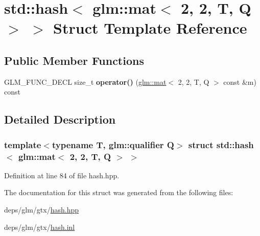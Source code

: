 \hypertarget{structstd_1_1hash_3_01glm_1_1mat_3_012_00_012_00_01T_00_01Q_01_4_01_4}{}\section{std\+:\+:hash$<$ glm\+:\+:mat$<$ 2, 2, T, Q $>$ $>$ Struct Template Reference}
\label{structstd_1_1hash_3_01glm_1_1mat_3_012_00_012_00_01T_00_01Q_01_4_01_4}
\subsection*{Public Member Functions}
\begin{DoxyCompactItemize}
\item 
\mbox{\label{structstd_1_1hash_3_01glm_1_1mat_3_012_00_012_00_01T_00_01Q_01_4_01_4_a495cf8c9679fe6360cb25d14711c1e94}} 
G\+L\+M\+\_\+\+F\+U\+N\+C\+\_\+\+D\+E\+CL size\+\_\+t {\bfseries operator()} (\hyperlink{structglm_1_1mat}{glm\+::mat}$<$ 2, 2, T, Q $>$ const \&m) const
\end{DoxyCompactItemize}


\subsection{Detailed Description}
\subsubsection*{template$<$typename T, glm\+::qualifier Q$>$\newline
struct std\+::hash$<$ glm\+::mat$<$ 2, 2, T, Q $>$ $>$}



Definition at line 84 of file hash.\+hpp.



The documentation for this struct was generated from the following files\+:\begin{DoxyCompactItemize}
\item 
deps/glm/gtx/\hyperlink{hash_8hpp}{hash.\+hpp}\item 
deps/glm/gtx/\hyperlink{hash_8inl}{hash.\+inl}\end{DoxyCompactItemize}
